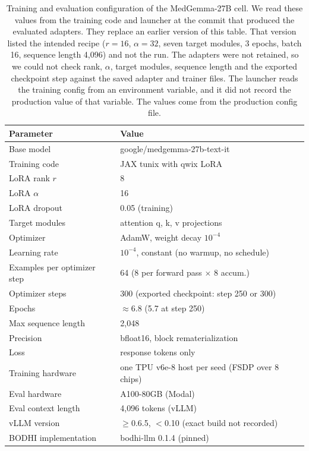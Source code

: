 \documentclass{article}
\newcommand{\bodhi}{BODHI}
\begin{document}
\begin{table}[t]
\centering
\caption{Training and evaluation configuration of the MedGemma-27B cell. We read these values
from the training code and launcher at the commit that produced the evaluated adapters.
They replace an earlier version of this table. That version listed the intended recipe
($r{=}16$, $\alpha{=}32$, seven target modules, 3 epochs, batch 16, sequence length 4,096) and
not the run. The adapters were not retained, so we could not check rank, $\alpha$, target modules,
sequence length and the exported checkpoint step against the saved adapter and trainer files. The launcher reads the training
config from an environment variable, and it did not record the production value of that
variable. The values come from the production config file.}
\label{tab:hparams}
\small
\begin{tabular}{ll}
\toprule
Parameter & Value \\
\midrule
Base model & google/medgemma-27b-text-it \\
Training code & JAX tunix with qwix LoRA \\
LoRA rank $r$ & 8 \\
LoRA $\alpha$ & 16 \\
LoRA dropout & 0.05 (training) \\
Target modules & attention q, k, v projections \\
Optimizer & AdamW, weight decay $10^{-4}$ \\
Learning rate & $10^{-4}$, constant (no warmup, no schedule) \\
Examples per optimizer step & 64 (8 per forward pass $\times$ 8 accum.) \\
Optimizer steps & 300 (exported checkpoint: step 250 or 300) \\
Epochs & ${\approx}$6.8 (5.7 at step 250) \\
Max sequence length & 2,048 \\
Precision & bfloat16, block rematerialization \\
Loss & response tokens only \\
Training hardware & one TPU v6e-8 host per seed (FSDP over 8 chips) \\
Eval hardware & A100-80GB (Modal) \\
Eval context length & 4,096 tokens (vLLM) \\
vLLM version & $\geq$0.6.5, $<$0.10 (exact build not recorded) \\
\bodhi{} implementation & bodhi-llm 0.1.4 (pinned) \\

\end{tabular}
\end{table}
\end{document}
